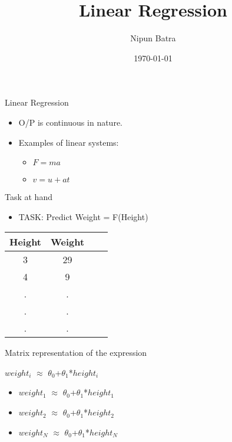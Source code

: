 \documentclass{beamer}
\title{Linear Regression}
\date{\today}
\author{Nipun Batra}
\institute{IIT Gandhinagar}
\begin{document}
  \maketitle
  
  
  

\begin{frame}{Linear Regression}
\begin{itemize}
	
	
	\item O/P is continuous in nature.
	\item Examples of linear systems:
	\begin{itemize}
		\item $F=ma$
		\item $v=u+at$
	\end{itemize}
	
\end{itemize}
\end{frame}

\begin{frame}{Task at hand}
\begin{itemize}

\item TASK: Predict Weight = F(Height)
\end{itemize}
\begin{center}
    

\begin{tabular}{ |c|c|c|c| } 
\hline
 Height & Weight \\
\hline
3 & 29 \\ 
4 & 9 \\ 
. & .\\
. & .\\
. & .\\

\hline
\end{tabular}
\end{center}
	

\end{frame}

\begin{frame}{Matrix representation of the expression}
\begin{center}
\begin{tcolorbox}
$weight_{i}$ $\approx$
$\theta_{0}$+$\theta_{1}$*$height_{i}$
\end{tcolorbox}
\end{center}

\begin{itemize}
\item $weight_{1}$ $\approx$
$\theta_{0}$+$\theta_{1}$*$height_{1}$

\item $weight_{2}$ $\approx$
$\theta_{0}$+$\theta_{1}$*$height_{2}$


\item $weight_{N}$ $\approx$
$\theta_{0}$+$\theta_{1}$*$height_{N}$

\end{itemize}
\end{frame}
\end{document}
